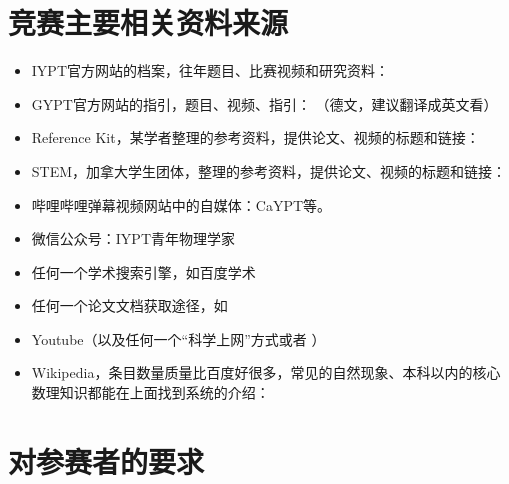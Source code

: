 \documentclass[a4paper,10pt,english]{sphinxmanual}
\begin{document}
\section{竞赛主要相关资料来源}
\label{\detokenize{2. Intro_Tournament:id5}}\begin{itemize}
\item {} 
IYPT官方网站的档案，往年题目、比赛视频和研究资料：

\item {} 
GYPT官方网站的指引，题目、视频、指引： （德文，建议翻译成英文看）

\item {} 
Reference Kit，某学者整理的参考资料，提供论文、视频的标题和链接： 

\item {} 
STEM，加拿大学生团体，整理的参考资料，提供论文、视频的标题和链接：

\item {} 
哔哩哔哩弹幕视频网站中的自媒体：CaYPT等。

\item {} 
微信公众号：IYPT青年物理学家

\item {} 
任何一个学术搜索引擎，如百度学术

\item {} 
任何一个论文文档获取途径，如 

\item {} 
Youtube（以及任何一个“科学上网”方式或者  ）

\item {} 
Wikipedia，条目数量质量比百度好很多，常见的自然现象、本科以内的核心数理知识都能在上面找到系统的介绍：

\end{itemize}


\section{对参赛者的要求}
\label{\detokenize{2. Intro_Tournament:onlinevideoconverter}}\label{\detokenize{2. Intro_Tournament:id6}}
\end{document}
